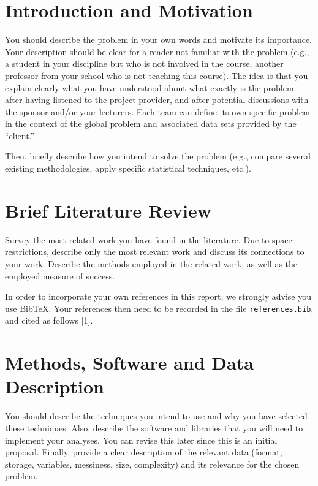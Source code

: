 \documentclass[mstat,12pt]{unswthesis}
\begin{document}
\hypertarget{introduction-and-motivation}{%
\section{Introduction and
Motivation}\label{introduction-and-motivation}}

You should describe the problem in your own words and motivate its
importance. Your description should be clear for a reader not familiar
with the problem (e.g., a student in your discipline but who is not
involved in the course, another professor from your school who is not
teaching this course). The idea is that you explain clearly what you
have understood about what exactly is the problem after having listened
to the project provider, and after potential discussions with the
sponsor and/or your lecturers. Each team can define its own specific
problem in the context of the global problem and associated data sets
provided by the ``client.''

\bigskip

Then, briefly describe how you intend to solve the problem (e.g.,
compare several existing methodologies, apply specific statistical
techniques, etc.).

\hypertarget{brief-literature-review}{%
\section{Brief Literature Review}\label{brief-literature-review}}

Survey the most related work you have found in the literature. Due to
space restrictions, describe only the most relevant work and discuss its
connections to your work. Describe the methods employed in the related
work, as well as the employed measure of success.

\bigskip

In order to incorporate your own references in this report, we strongly
advise you use BibTeX. Your references then need to be recorded in the
file \texttt{references.bib}, and cited as follows {[}1{]}.

\hypertarget{methods-software-and-data-description}{%
\section{Methods, Software and Data
Description}\label{methods-software-and-data-description}}

You should describe the techniques you intend to use and why you have
selected these techniques. Also, describe the software and libraries
that you will need to implement your analyses. You can revise this later
since this is an initial proposal. Finally, provide a clear description
of the relevant data (format, storage, variables, messiness, size,
complexity) and its relevance for the chosen problem.
\end{document}
